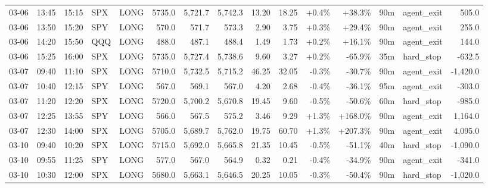 \documentclass[11pt,a4paper,twoside]{article}
\begin{document}
\begin{landscape}
\begin{center}
\begin{longtable}{>{\color{txtmain}}l l l l l r r r r r r r r >{\color{txtmain}}l r}
03-06 & 13:45 & 15:15 & SPX & LONG & 5735.0 & 5,721.7 & 5,742.3 & 13.20 & 18.25 & \textcolor{wingreen}{+0.4\%} & \textcolor{wingreen}{+38.3\%} & 90m & agent\_exit & \textcolor{wingreen}{505.0} \\
03-06 & 13:50 & 15:20 & SPY & LONG & 570.0 & 571.7 & 573.3 & 2.90 & 3.75 & \textcolor{wingreen}{+0.3\%} & \textcolor{wingreen}{+29.4\%} & 90m & agent\_exit & \textcolor{wingreen}{255.0} \\
03-06 & 14:20 & 15:50 & QQQ & LONG & 488.0 & 487.1 & 488.4 & 1.49 & 1.73 & \textcolor{wingreen}{+0.2\%} & \textcolor{wingreen}{+16.1\%} & 90m & agent\_exit & \textcolor{wingreen}{144.0} \\
03-06 & 15:25 & 16:00 & SPX & LONG & 5735.0 & 5,727.4 & 5,738.6 & 9.60 & 3.27 & \textcolor{wingreen}{+0.2\%} & \textcolor{lossred}{-65.9\%} & 35m & hard\_stop & \textcolor{lossred}{-632.5} \\
03-07 & 09:40 & 11:10 & SPX & LONG & 5710.0 & 5,732.5 & 5,715.2 & 46.25 & 32.05 & \textcolor{lossred}{-0.3\%} & \textcolor{lossred}{-30.7\%} & 90m & agent\_exit & \textcolor{lossred}{-1,420.0} \\
03-07 & 10:40 & 12:15 & SPY & LONG & 567.0 & 569.1 & 567.0 & 4.20 & 2.68 & \textcolor{lossred}{-0.4\%} & \textcolor{lossred}{-36.1\%} & 95m & agent\_exit & \textcolor{lossred}{-303.0} \\
03-07 & 11:20 & 12:20 & SPX & LONG & 5720.0 & 5,700.2 & 5,670.8 & 19.45 & 9.60 & \textcolor{lossred}{-0.5\%} & \textcolor{lossred}{-50.6\%} & 60m & hard\_stop & \textcolor{lossred}{-985.0} \\
03-07 & 12:25 & 13:55 & SPY & LONG & 566.0 & 567.5 & 575.2 & 3.46 & 9.29 & \textcolor{wingreen}{+1.3\%} & \textcolor{wingreen}{+168.0\%} & 90m & agent\_exit & \textcolor{wingreen}{1,164.0} \\
03-07 & 12:30 & 14:00 & SPX & LONG & 5705.0 & 5,689.7 & 5,762.0 & 19.75 & 60.70 & \textcolor{wingreen}{+1.3\%} & \textcolor{wingreen}{+207.3\%} & 90m & agent\_exit & \textcolor{wingreen}{4,095.0} \\
03-10 & 09:40 & 10:20 & SPX & LONG & 5715.0 & 5,692.0 & 5,665.8 & 21.35 & 10.45 & \textcolor{lossred}{-0.5\%} & \textcolor{lossred}{-51.1\%} & 40m & hard\_stop & \textcolor{lossred}{-1,090.0} \\
03-10 & 09:55 & 11:25 & SPY & LONG & 577.0 & 567.0 & 564.9 & 0.32 & 0.21 & \textcolor{lossred}{-0.4\%} & \textcolor{lossred}{-34.9\%} & 90m & agent\_exit & \textcolor{lossred}{-341.0} \\
03-10 & 10:30 & 12:00 & SPX & LONG & 5680.0 & 5,663.1 & 5,646.5 & 20.25 & 10.05 & \textcolor{lossred}{-0.3\%} & \textcolor{lossred}{-50.4\%} & 90m & hard\_stop & \textcolor{lossred}{-1,020.0} \\

\end{longtable}
\end{center}
\end{landscape}
\end{document}
